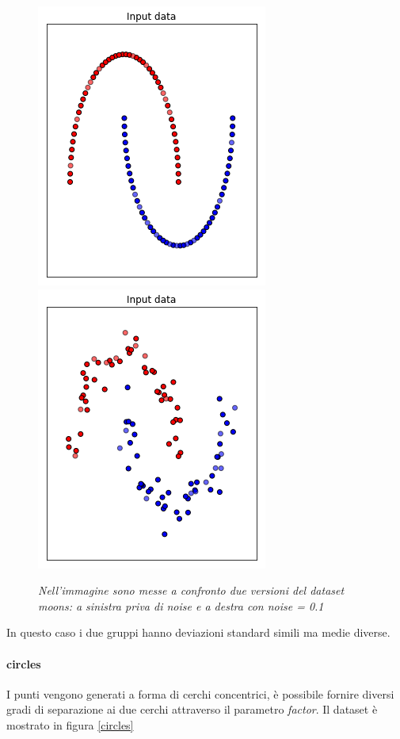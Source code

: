 \documentclass[12pt,a4paper]{report}
\begin{document}
\begin{figure}[H]
 \centering
 \includegraphics[scale = 0.5]{images/moons_nonoise}
 \includegraphics[scale = 0.5]{images/moons_noise}
 \caption{\textit{Nell'immagine sono messe a confronto due versioni del dataset moons: a sinistra priva di noise e a destra con noise = 0.1}}
 \label{moons}
\end{figure}

In questo caso i due gruppi hanno deviazioni standard simili ma medie diverse.

\paragraph{circles} I punti vengono generati a forma di cerchi concentrici, è possibile fornire diversi gradi di separazione ai due cerchi attraverso il parametro \textit{factor}. Il dataset è mostrato in figura \ref{circles}
\end{document}
